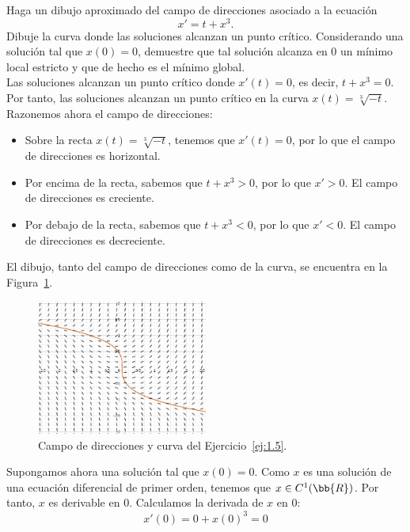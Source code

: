 \begin{ejercicio} \label{ej:1.5}
    Haga un dibujo aproximado del campo de direcciones asociado a la ecuación
    \begin{equation*}
        x' = t + x^3.
    \end{equation*}
    Dibuje la curva donde las soluciones alcanzan un punto crítico. Considerando una solución tal que \(x(0) = 0\), demuestre que tal solución alcanza en 0 un mínimo local estricto y que de hecho es el mínimo global.\\

    Las soluciones alcanzan un punto crítico donde $x'(t)=0$, es decir, $t+x^3=0$. Por tanto, las soluciones alcanzan un punto crítico en la curva $x(t)=\sqrt[3]{-t}$.
    Razonemos ahora el campo de direcciones:
    \begin{itemize}
        \item Sobre la recta $x(t)=\sqrt[3]{-t}$, tenemos que $x'(t)=0$, por lo que el campo de direcciones es horizontal.
        \item Por encima de la recta, sabemos que $t+x^3>0$, por lo que $x'>0$. El campo de direcciones es creciente.
        \item Por debajo de la recta, sabemos que $t+x^3<0$, por lo que $x'<0$. El campo de direcciones es decreciente.
    \end{itemize}
    El dibujo, tanto del campo de direcciones como de la curva, se encuentra en la Figura~\ref{fig:ej1.5}.
    \begin{figure}[H]
        \centering
        \includegraphics[width=0.5\textwidth]{Imagenes/Rel1_Ej5.png}
        \caption{Campo de direcciones y curva del Ejercicio~\ref{ej:1.5}.}
        \label{fig:ej1.5}
    \end{figure}

    Supongamos ahora una solución tal que $x(0)=0$. Como $x$ es una solución de una ecuación diferencial de primer orden, tenemos que $x\in C^1(\bb{R})$. Por tanto, $x$ es derivable en $0$. Calculamos la derivada de $x$ en $0$:
    \begin{equation*}
        x'(0) = 0 + x(0)^3 = 0
    \end{equation*}


\end{ejercicio}

